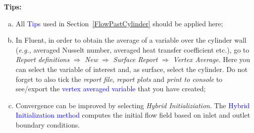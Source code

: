 \documentclass[12pts,a4paper,amsmath,amssymb,floatfix]{article}%
\newcommand{\blue}{\textcolor{blue}}
\newcommand{\eg}{{\it e.g., }}
\begin{document}
     \begin{shaded}
        \begin{center} {\bf Tips: } \end{center}
        \begin{enumerate}[a)]
           \item All \blue{Tips} used in Section~\ref{FlowPastCylinder} should be applied here;
           \item In Fluent, in order to obtain the average of a variable over the cylinder wall (\eg averaged Nusselt number, averaged heat transfer coefficient etc.), go to {\it Report definitions} $\Rightarrow$ {\it New} $\Rightarrow$ {\it Surface Report}  $\Rightarrow$ {\it Vertex Average}. Here you can select the variable of interest and, as surface, select the cylinder. Do not forget to also tick the {\it report file}, {\it report plots} and {\it print to console} to see/export the \blue{vertex averaged variable} that you have created;
           \item Convergence can be improved by selecting {\it Hybrid Initializiation}. The \blue{Hybrid Initialization method} computes the initial flow field based on inlet and outlet boundary conditions.
        \end{enumerate}
     \end{shaded}
     
\end{document}
